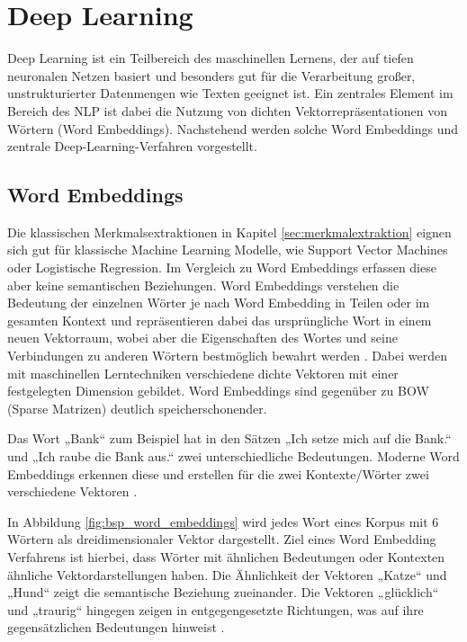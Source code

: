 \section{Deep Learning}
\label{sec:deep_learning}

Deep Learning ist ein Teilbereich des maschinellen Lernens, der auf tiefen neuronalen Netzen basiert und besonders gut für die Verarbeitung großer, 
unstrukturierter Datenmengen wie Texten geeignet ist.
Ein zentrales Element im Bereich des NLP ist dabei die Nutzung von dichten Vektorrepräsentationen von Wörtern (Word Embeddings).
Nachstehend werden solche Word Embeddings und zentrale Deep-Learning-Verfahren vorgestellt.


\subsection{Word Embeddings}
\label{sec:word_embeddings}

Die klassischen Merkmalsextraktionen in Kapitel \ref{sec:merkmalextraktion} eignen sich gut für klassische Machine Learning Modelle, wie
Support Vector Machines oder Logistische Regression.
Im Vergleich zu Word Embeddings erfassen diese aber keine semantischen Beziehungen.
Word Embeddings verstehen die Bedeutung der einzelnen Wörter je nach Word Embedding in Teilen oder im gesamten Kontext \cite{Deshai:2023aa}
und repräsentieren dabei das ursprüngliche Wort in einem neuen Vektorraum, wobei aber die Eigenschaften des Wortes und seine Verbindungen 
zu anderen Wörtern bestmöglich bewahrt werden \cite{Schaer2023}.
Dabei werden mit maschinellen Lerntechniken verschiedene dichte Vektoren mit einer festgelegten Dimension gebildet.
Word Embeddings sind gegenüber zu BOW (Sparse Matrizen) deutlich speicherschonender.

Das Wort „Bank“ zum Beispiel hat in den Sätzen „Ich setze mich auf die Bank.“ und „Ich raube die Bank aus.“ zwei unterschiedliche Bedeutungen. 
Moderne Word Embeddings erkennen diese und erstellen für die zwei Kontexte/Wörter zwei verschiedene Vektoren \cite{skopos2023wordembeddings}.

In Abbildung \ref{fig:bsp_word_embeddings} wird jedes Wort eines Korpus mit 6 Wörtern als dreidimensionaler Vektor dargestellt.
Ziel eines Word Embedding Verfahrens ist hierbei, dass Wörter mit ähnlichen Bedeutungen oder Kontexten ähnliche Vektordarstellungen haben. 
Die Ähnlichkeit der Vektoren „Katze“ und „Hund“ zeigt die semantische Beziehung zueinander. Die Vektoren „glücklich“ und „traurig“ 
hingegen zeigen in entgegengesetzte Richtungen, was auf ihre gegensätzlichen Bedeutungen hinweist \cite{ibm2024wordembeddings}.

